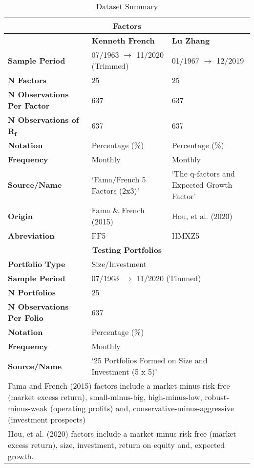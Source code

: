 \documentclass[11pt, english]{article}
\begin{document}
\begin{table}[h]
        \tiny
\begin{center}
\begin{tabular}{ p{3.5cm} p{4cm} p{4.5cm} }
        \hline
        \hline
        \multicolumn{3}{c}{\textbf{Factors}}\\
        \hline
        \hline
        & \textbf{Kenneth French} & \textbf{Lu Zhang}\\
        \hline
        \textbf{Sample Period} & 07/1963 $\rightarrow$ 11/2020 (Trimmed) & 01/1967 $\rightarrow$ 12/2019\\
        \textbf{N Factors} & 25 & 25\\
        \textbf{N Observations Per Factor} & 637 & 637\\
        \textbf{N Observations of R$\mathbf{_f}$} & 637 & 637\\
        \textbf{Notation} & Percentage (\%) & Percentage (\%)\\
        \textbf{Frequency} & Monthly & Monthly\\ 
        \textbf{Source/Name} & `Fama/French 5 Factors (2x3)' & `The q-factors and Expected Growth Factor'\\
	\textbf{Origin} & Fama \& French (2015) & Hou, et al. (2020)\\
	\textbf{Abreviation} & FF5 & HMXZ5\\
        \hline
        \hline
        \multicolumn{3}{c}{\textbf{Testing Portfolios}}\\
        \hline
        \hline
        \textbf{Portfolio Type} & \multicolumn{2}{l}{Size/Investment}\\
        \textbf{Sample Period} & \multicolumn{2}{l}{07/1963 $\rightarrow$ 11/2020 (Timmed)}\\
        \textbf{N Portfolios} & \multicolumn{2}{l}{25}\\
        \textbf{N Observations Per Folio} & \multicolumn{2}{l}{637}\\
        \textbf{Notation} & \multicolumn{2}{l}{Percentage (\%)}\\
        \textbf{Frequency} & \multicolumn{2}{l}{Monthly}\\
        \textbf{Source/Name} & \multicolumn{2}{l}{`25 Portfolios Formed on Size and Investment (5 x 5)'}\\
        \hline
        \multicolumn{3}{p{13cm}}{Fama and French (2015) factors include a market-minus-risk-free (market excess return), small-minus-big, high-minus-low, robust-minus-weak (operating profits) and, conservative-minus-aggressive (investment prospects)}\\
        \multicolumn{3}{p{13cm}}{Hou, et al. (2020) factors include a market-minus-risk-free (market excess return), size, investment, return on equity and, expected growth.}\\
        \hline
\end{tabular}
        \caption{Dataset Summary}
\end{center}
\end{table}
\end{document}
